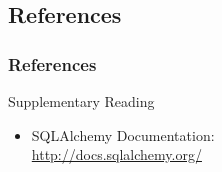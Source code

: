 \documentclass[dvipsnames]{beamer}
\theoremstyle{plain}
\begin{document}
\subsection*{References}

\begin{frame}
  \frametitle{References}

  \begin{block}{Supplementary Reading}
    \begin{itemize}
    \item SQLAlchemy Documentation:\\
      \url{http://docs.sqlalchemy.org/}
    \end{itemize}
  \end{block}
\end{frame}
\end{document}
